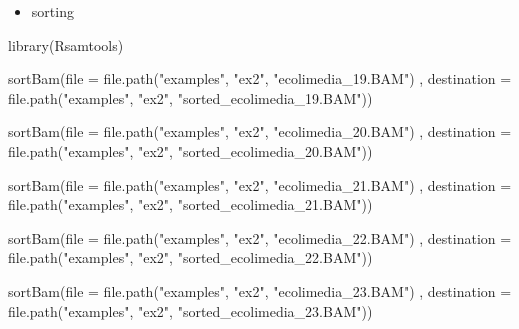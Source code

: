 \documentclass[
]{book}
\newenvironment{Shaded}{\begin{snugshade}}{\end{snugshade}}
\newcommand{\AttributeTok}[1]{\textcolor[rgb]{0.77,0.63,0.00}{#1}}
\newcommand{\FunctionTok}[1]{\textcolor[rgb]{0.00,0.00,0.00}{#1}}
\newcommand{\NormalTok}[1]{#1}
\newcommand{\StringTok}[1]{\textcolor[rgb]{0.31,0.60,0.02}{#1}}
\providecommand{\tightlist}{%
  \setlength{\itemsep}{0pt}\setlength{\parskip}{0pt}}
\begin{document}
\begin{itemize}
\tightlist
\item
  sorting
\end{itemize}

\begin{Shaded}
\begin{Highlighting}[]
\FunctionTok{library}\NormalTok{(Rsamtools)}



\FunctionTok{sortBam}\NormalTok{(}\AttributeTok{file =} \FunctionTok{file.path}\NormalTok{(}\StringTok{"examples"}\NormalTok{, }\StringTok{"ex2"}\NormalTok{, }\StringTok{"ecolimedia\_19.BAM"}\NormalTok{)}
\NormalTok{        , }\AttributeTok{destination =} \FunctionTok{file.path}\NormalTok{(}\StringTok{"examples"}\NormalTok{, }\StringTok{"ex2"}\NormalTok{, }\StringTok{"sorted\_ecolimedia\_19.BAM"}\NormalTok{))}

\FunctionTok{sortBam}\NormalTok{(}\AttributeTok{file =} \FunctionTok{file.path}\NormalTok{(}\StringTok{"examples"}\NormalTok{, }\StringTok{"ex2"}\NormalTok{, }\StringTok{"ecolimedia\_20.BAM"}\NormalTok{)}
\NormalTok{        , }\AttributeTok{destination =} \FunctionTok{file.path}\NormalTok{(}\StringTok{"examples"}\NormalTok{, }\StringTok{"ex2"}\NormalTok{, }\StringTok{"sorted\_ecolimedia\_20.BAM"}\NormalTok{))}

\FunctionTok{sortBam}\NormalTok{(}\AttributeTok{file =} \FunctionTok{file.path}\NormalTok{(}\StringTok{"examples"}\NormalTok{, }\StringTok{"ex2"}\NormalTok{, }\StringTok{"ecolimedia\_21.BAM"}\NormalTok{)}
\NormalTok{        , }\AttributeTok{destination =} \FunctionTok{file.path}\NormalTok{(}\StringTok{"examples"}\NormalTok{, }\StringTok{"ex2"}\NormalTok{, }\StringTok{"sorted\_ecolimedia\_21.BAM"}\NormalTok{))}

\FunctionTok{sortBam}\NormalTok{(}\AttributeTok{file =} \FunctionTok{file.path}\NormalTok{(}\StringTok{"examples"}\NormalTok{, }\StringTok{"ex2"}\NormalTok{, }\StringTok{"ecolimedia\_22.BAM"}\NormalTok{)}
\NormalTok{        , }\AttributeTok{destination =} \FunctionTok{file.path}\NormalTok{(}\StringTok{"examples"}\NormalTok{, }\StringTok{"ex2"}\NormalTok{, }\StringTok{"sorted\_ecolimedia\_22.BAM"}\NormalTok{))}

\FunctionTok{sortBam}\NormalTok{(}\AttributeTok{file =} \FunctionTok{file.path}\NormalTok{(}\StringTok{"examples"}\NormalTok{, }\StringTok{"ex2"}\NormalTok{, }\StringTok{"ecolimedia\_23.BAM"}\NormalTok{)}
\NormalTok{        , }\AttributeTok{destination =} \FunctionTok{file.path}\NormalTok{(}\StringTok{"examples"}\NormalTok{, }\StringTok{"ex2"}\NormalTok{, }\StringTok{"sorted\_ecolimedia\_23.BAM"}\NormalTok{))}


\end{Highlighting}
\end{Shaded}
\end{document}
